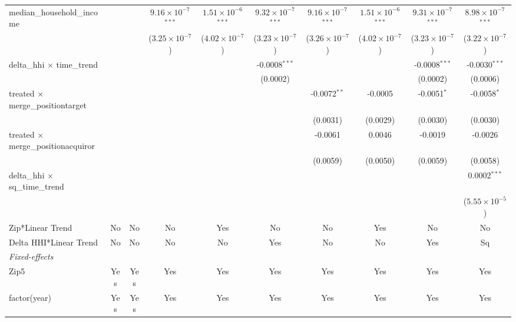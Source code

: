 \begin{table}[H]
{\begin{tabular}{lccccccccc}
 median\_household\_income&   &    & $9.16\times 10^{-7}$$^{***}$ & $1.51\times 10^{-6}$$^{***}$ & $9.32\times 10^{-7}$$^{***}$ & $9.16\times 10^{-7}$$^{***}$ & $1.51\times 10^{-6}$$^{***}$ & $9.31\times 10^{-7}$$^{***}$ & $8.98\times 10^{-7}$$^{***}$\\ 

   &   &    & ($3.25\times 10^{-7}$) & ($4.02\times 10^{-7}$) & ($3.23\times 10^{-7}$) & ($3.26\times 10^{-7}$) & ($4.02\times 10^{-7}$) & ($3.23\times 10^{-7}$) & ($3.22\times 10^{-7}$)\\ 

 delta\_hhi $\times $ time\_trend&   &    &    &    & -0.0008$^{***}$ &    &    & -0.0008$^{***}$ & -0.0030$^{***}$\\ 

   &   &    &    &    & (0.0002) &    &    & (0.0002) & (0.0006)\\ 

 treated $\times $ merge\_positiontarget&   &    &    &    &    & -0.0072$^{**}$ & -0.0005 & -0.0051$^{*}$ & -0.0058$^{*}$\\ 

   &   &    &    &    &    & (0.0031) & (0.0029) & (0.0030) & (0.0030)\\ 

 treated $\times $ merge\_positionacquiror&   &    &    &    &    & -0.0061 & 0.0046 & -0.0019 & -0.0026\\ 

   &   &    &    &    &    & (0.0059) & (0.0050) & (0.0059) & (0.0058)\\ 

 delta\_hhi $\times $ sq\_time\_trend&   &    &    &    &    &    &    &    & 0.0002$^{***}$\\ 

   &   &    &    &    &    &    &    &    & ($5.55\times 10^{-5}$)\\ 

 Zip*Linear Trend & No & No & No & Yes & No & No & Yes & No & No\\ 

 Delta HHI*Linear Trend & No & No & No & No & Yes & No & No & Yes & Sq\\ 

 \midrule \emph{Fixed-effects}&   &   &   &   &   &   &   &   &  \\ 

 Zip5 & Yes & Yes & Yes & Yes & Yes & Yes & Yes & Yes & Yes\\ 

 factor(year) & Yes & Yes & Yes & Yes & Yes & Yes & Yes & Yes & Yes\\ 


\end{tabular}}
\end{table}
